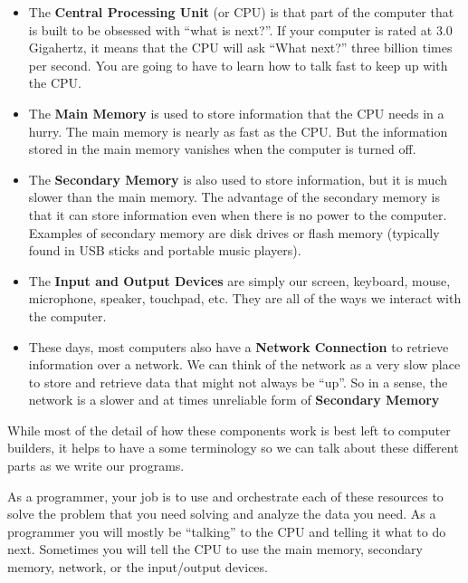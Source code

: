 \documentclass[10pt]{book}
\begin{document}
\begin{itemize}

\item The {\bf Central Processing Unit} (or CPU) is 
that part of the computer that is built to be obsessed 
with ``what is next?''.  If your computer is rated
at 3.0 Gigahertz, it means that the CPU will ask ``What next?''
three billion times per second.  You are going to have to 
learn how to talk fast to keep up with the CPU.

\item The {\bf Main Memory} is used to store information
that the CPU needs in a hurry.  The main memory is nearly as 
fast as the CPU.  But the information stored in the main
memory vanishes when the computer is turned off.

\item The {\bf Secondary Memory} is also used to store
information, but it is much slower than the main memory.
The advantage of the secondary memory is that it can
store information even when there is no power to the
computer.  Examples of secondary memory are disk drives
or flash memory (typically found in USB sticks and portable
music players).

\item The {\bf Input and Output Devices} are simply our
screen, keyboard, mouse, microphone, speaker, touchpad, etc.  
They are all of the ways we interact with the computer.

\item These days, most computers also have a
{\bf Network Connection} to retrieve information over a network.
We can think of the network as a very slow place to store and
retrieve data that might not always be ``up''.  So in a sense,
the network is a slower and at times unreliable form of
{\bf Secondary Memory}

\end{itemize}

While most of the detail of how these components work is best left 
to computer builders, it helps to have a some terminology
so we can talk about these different parts as we write our programs.

As a programmer, your job is to use and orchestrate 
each of these resources to solve the problem that you need solving
and analyze the data you need.  As a programmer you will 
mostly be ``talking'' to the CPU and telling it what to 
do next.  Sometimes you will tell the CPU to use the main memory,
secondary memory, network, or the input/output devices.
\end{document}
